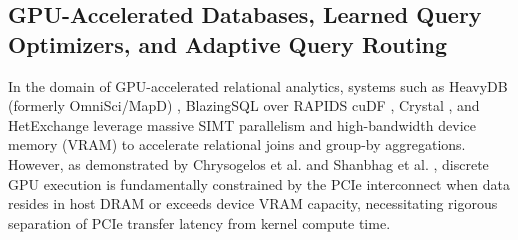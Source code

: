 \documentclass[10pt,a4paper]{article}
\begin{document}
\subsection{GPU-Accelerated Databases, Learned Query Optimizers, and Adaptive Query Routing}
In the domain of GPU-accelerated relational analytics, systems such as HeavyDB (formerly OmniSci/MapD) \cite{root2019mapd}, BlazingSQL over RAPIDS cuDF \cite{kim2022blazingsql}, Crystal \cite{shanbhag2020crystal}, and HetExchange \cite{chrysogelos2019hetexchange} leverage massive SIMT parallelism and high-bandwidth device memory (VRAM) to accelerate relational joins and group-by aggregations. However, as demonstrated by Chrysogelos et al. \cite{chrysogelos2019hetexchange} and Shanbhag et al. \cite{shanbhag2020crystal}, discrete GPU execution is fundamentally constrained by the PCIe interconnect when data resides in host DRAM or exceeds device VRAM capacity, necessitating rigorous separation of PCIe transfer latency from kernel compute time.
\end{document}

